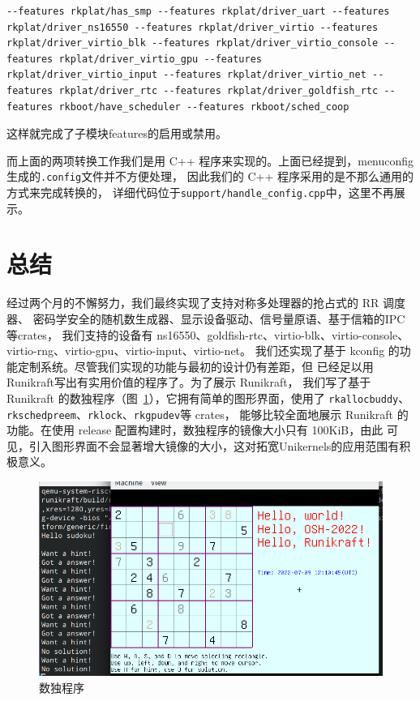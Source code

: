 \documentclass{../runikraft-report}
\begin{document}
\begin{lstlisting}
--features rkplat/has_smp --features rkplat/driver_uart --features rkplat/driver_ns16550 --features rkplat/driver_virtio --features rkplat/driver_virtio_blk --features rkplat/driver_virtio_console --features rkplat/driver_virtio_gpu --features rkplat/driver_virtio_input --features rkplat/driver_virtio_net --features rkplat/driver_rtc --features rkplat/driver_goldfish_rtc --features rkboot/have_scheduler --features rkboot/sched_coop
\end{lstlisting}

这样就完成了子模块features的启用或禁用。

而上面的两项转换工作我们是用 C++ 程序来实现的。上面已经提到，menuconfig生成的\texttt{.config}文件并不方便处理，
因此我们的 C++ 程序采用的是不那么通用的方式来完成转换的，
详细代码位于\texttt{support/handle\_config.cpp}中，这里不再展示。

\section{总结}
经过两个月的不懈努力，我们最终实现了支持对称多处理器的抢占式的 RR 调度器、
密码学安全的随机数生成器、显示设备驱动、信号量原语、基于信箱的IPC等crates，
我们支持的设备有 ns16550、goldfish-rtc、virtio-blk、virtio-console、
virtio-rng、virtio-gpu、virtio-input、virtio-net。
我们还实现了基于 kconfig 的功能定制系统。尽管我们实现的功能与最初的设计仍有差距，但
已经足以用Runikraft写出有实用价值的程序了。为了展示 Runikraft，
我们写了基于 Runikraft 的数独程序（图\ \ref{fig:sudoku}），它拥有简单的图形界面，使用了 \texttt{rkallocbuddy}、\texttt{rkschedpreem}、\texttt{rklock}、\texttt{rkgpudev}等 crates，
能够比较全面地展示 Runikraft 的功能。在使用 release 配置构建时，数独程序的镜像大小只有 100KiB，由此
可见，引入图形界面不会显著增大镜像的大小，这对拓宽Unikernels的应用范围有积极意义。

\begin{figure}[tbh!]
\centering
\includegraphics[width=0.6\linewidth]{../assets/sudoku}
\caption{数独程序}
\label{fig:sudoku}
\end{figure}
\end{document}
